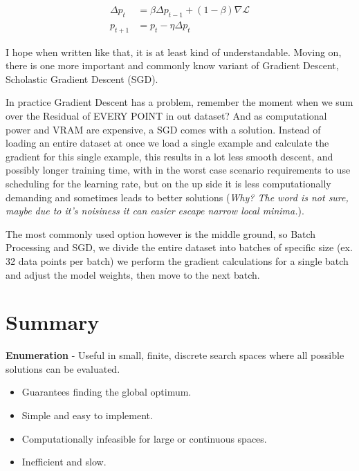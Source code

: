 \documentclass{article}
\begin{document}
\begin{align*}
    \Delta p_t &= \beta \Delta p_{t-1} + (1-\beta)\nabla\mathcal L\\
    p_{t+1} &= p_t - \eta\Delta p_t
\end{align*}

I hope when written like that, it is at least kind of understandable. Moving on, there is one more important and commonly know variant of Gradient Descent, Scholastic Gradient Descent (SGD).

In practice Gradient Descent has a problem, remember the moment when we sum over the Residual of EVERY POINT in out dataset? And as computational power and VRAM are expensive, a SGD comes with a solution. Instead of loading an entire dataset at once we load a single example and calculate the gradient for this single example, this results in a lot less smooth descent, and possibly longer training time, with in the worst case scenario requirements to use scheduling for the learning rate, but on the up side it is less computationally demanding and sometimes leads to better solutions (\textit{Why? The word is not sure, maybe due to it's noisiness it can easier escape narrow local minima.}).

The most commonly used option however is the middle ground, so Batch Processing and SGD, we divide the entire dataset into batches of specific size (ex. 32 data points per batch) we perform the gradient calculations for a single batch and adjust the model weights, then move to the next batch.

\break

\section{Summary}

\textbf{Enumeration} - Useful in small, finite, discrete search spaces where all possible solutions can be evaluated.

\begin{itemize}[label=]
    \item Guarantees finding the global optimum.
    \item Simple and easy to implement.
\end{itemize}
\begin{itemize}[label=]
    \item Computationally infeasible for large or continuous spaces.
    \item Inefficient and slow.
\end{itemize}
\end{document}

